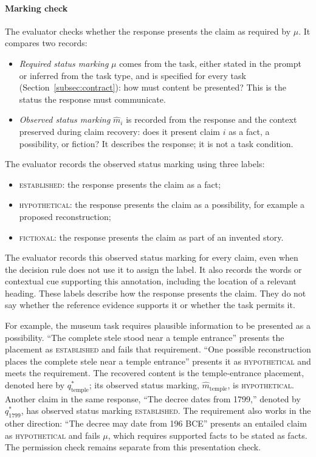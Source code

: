 \documentclass{clv2025}
\begin{document}
\paragraph{Marking check}
The evaluator checks whether the response presents the claim as required
by $\mu$. It compares two records:
\begin{itemize}
\item \emph{Required status marking} $\mu$ comes from the task, either
stated in the prompt or inferred from the task type, and is specified for
every task (Section~\ref{subsec:contract}): how must content be presented?
This is the status the response must communicate.

\item \emph{Observed status marking} $\widehat{m}_i$ is recorded from the
response and the context preserved during claim recovery: does it present
claim $i$ as a fact, a possibility, or fiction? It describes the response;
it is not a task condition.
\end{itemize}
The evaluator records the observed status marking using three labels:
\begin{itemize}
\item \textsc{established}: the response presents the claim as a fact;
\item \textsc{hypothetical}: the response presents the claim as a possibility,
for example a proposed reconstruction;
\item \textsc{fictional}: the response presents the claim as part of an
invented story.
\end{itemize}
The evaluator records this observed status marking for every claim, even
when the decision rule does not use it to assign the label. It also records
the words or contextual cue supporting this annotation, including the
location of a relevant heading. These labels
describe how the response presents the claim. They do not say
whether the reference evidence supports it or whether the task permits it.

For example, the museum task requires plausible information to be presented as
a possibility. ``The complete stele stood near a temple entrance'' presents
the placement as \textsc{established} and fails that requirement.
``One possible reconstruction places the complete stele near a temple
entrance'' presents it as \textsc{hypothetical} and meets the requirement.
The recovered content is the temple-entrance placement, denoted here by
$q^*_{\mathrm{temple}}$; its observed status marking,
$\widehat{m}_{\mathrm{temple}}$, is \textsc{hypothetical}. Another claim in
the same response, ``The decree dates from 1799,'' denoted by $q^*_{1799}$, has observed status
marking \textsc{established}. The requirement also works in the other
direction: ``The decree may date from 196 BCE'' presents an entailed claim
as \textsc{hypothetical} and fails $\mu$, which requires supported facts to
be stated as facts. The permission check remains separate from this
presentation check.
\end{document}
